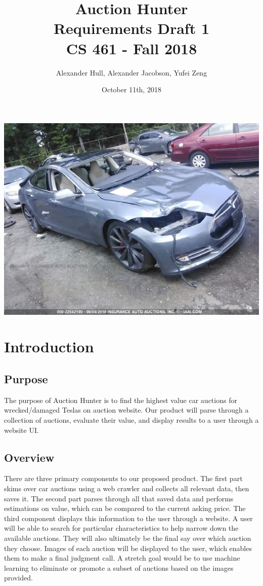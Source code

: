 \documentclass[draftclsnofoot,onecolumn,10pt]{IEEEtran}
\title{Auction Hunter \\ Requirements Draft 1\\CS 461 - Fall 2018}
\author{Alexander Hull, Alexander Jacobson, Yufei Zeng}
\date{October 11th, 2018}
\begin{document}
\maketitle

\includegraphics{model-s.eps}

\newpage
\section{Introduction}
\subsection{Purpose}
The purpose of Auction Hunter is to find the highest value car auctions for wrecked/damaged Teslas on auction website.
Our product will parse through a collection of auctions, evaluate their value, and display results to a user through a website UI. 
\subsection{Overview}
There are three primary components to our proposed product. The first part skims over car auctions using a web crawler and collects all relevant data, then saves it. The second part parses through all that saved data and performs estimations on value, which can be compared to the current asking price. The third component displays this information to the user through a website. A user will be able to search for particular characteristics to help narrow down the available auctions. They will also ultimately be the final say over which auction they choose. Images of each auction will be displayed to the user, which enables them to make a final judgment call. A stretch goal would be to use machine learning to eliminate or promote a subset of auctions based on the images provided.
\end{document}
